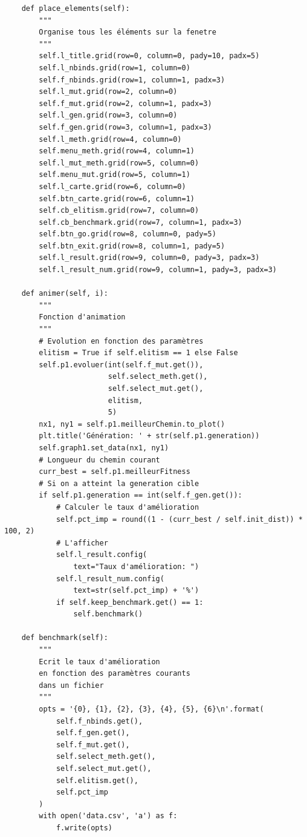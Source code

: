 \documentclass[12pt]{article}
\begin{document}
\begin{verbatim}
    def place_elements(self):
        """
        Organise tous les éléments sur la fenetre
        """
        self.l_title.grid(row=0, column=0, pady=10, padx=5)
        self.l_nbinds.grid(row=1, column=0)
        self.f_nbinds.grid(row=1, column=1, padx=3)
        self.l_mut.grid(row=2, column=0)
        self.f_mut.grid(row=2, column=1, padx=3)
        self.l_gen.grid(row=3, column=0)
        self.f_gen.grid(row=3, column=1, padx=3)
        self.l_meth.grid(row=4, column=0)
        self.menu_meth.grid(row=4, column=1)
        self.l_mut_meth.grid(row=5, column=0)
        self.menu_mut.grid(row=5, column=1)
        self.l_carte.grid(row=6, column=0)
        self.btn_carte.grid(row=6, column=1)
        self.cb_elitism.grid(row=7, column=0)
        self.cb_benchmark.grid(row=7, column=1, padx=3)
        self.btn_go.grid(row=8, column=0, pady=5)
        self.btn_exit.grid(row=8, column=1, pady=5)
        self.l_result.grid(row=9, column=0, pady=3, padx=3)
        self.l_result_num.grid(row=9, column=1, pady=3, padx=3)

    def animer(self, i):
        """
        Fonction d'animation
        """
        # Evolution en fonction des paramètres
        elitism = True if self.elitism == 1 else False
        self.p1.evoluer(int(self.f_mut.get()),
                        self.select_meth.get(),
                        self.select_mut.get(),
                        elitism,
                        5)
        nx1, ny1 = self.p1.meilleurChemin.to_plot()
        plt.title('Génération: ' + str(self.p1.generation))
        self.graph1.set_data(nx1, ny1)
        # Longueur du chemin courant
        curr_best = self.p1.meilleurFitness
        # Si on a atteint la generation cible
        if self.p1.generation == int(self.f_gen.get()):
            # Calculer le taux d'amélioration
            self.pct_imp = round((1 - (curr_best / self.init_dist)) * 100, 2)
            # L'afficher
            self.l_result.config(
                text="Taux d'amélioration: ")
            self.l_result_num.config(
                text=str(self.pct_imp) + '%')
            if self.keep_benchmark.get() == 1:
                self.benchmark()

    def benchmark(self):
        """
        Ecrit le taux d'amélioration
        en fonction des paramètres courants
        dans un fichier
        """
        opts = '{0}, {1}, {2}, {3}, {4}, {5}, {6}\n'.format(
            self.f_nbinds.get(),
            self.f_gen.get(),
            self.f_mut.get(),
            self.select_meth.get(),
            self.select_mut.get(),
            self.elitism.get(),
            self.pct_imp
        )
        with open('data.csv', 'a') as f:
            f.write(opts)


\end{verbatim}
\end{document}
